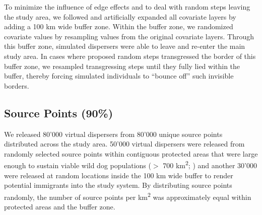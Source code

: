 \documentclass[abstract=on,10pt,a4paper,bibliography=totocnumbered]{article}
\begin{document}
To minimize the influence of edge effects and to deal with random steps leaving
the study area, we followed \citep{Koen.2010} and artificially expanded all
covariate layers by adding a 100 km wide buffer zone. Within the buffer zone, we
randomized covariate values by resampling values from the original covariate
layers. Through this buffer zone, simulated dispersers were able to leave and
re-enter the main study area. In cases where proposed random steps transgressed
the border of this buffer zone, we resampled transgressing steps until they
fully lied within the buffer, thereby forcing simulated individuals to ``bounce
off'' such invisible borders.

\subsection{Source Points (90\%)}
We released 80'000 virtual dispersers from 80'000 unique source points
distributed across the study area. 50'000 virtual dispersers were released from
randomly selected source points within contiguous protected areas that were
large enough to sustain viable wild dog populations (\(>\) 700
km\textsuperscript{2}; \citealp{Pomilia.2015}) and another 30'000 were released
at random locations inside the 100 km wide buffer to render potential immigrants
into the study system. By distributing source points randomly, the number of
source points per km\textsuperscript{2} was approximately equal within protected
areas and the buffer zone.

\end{document}
